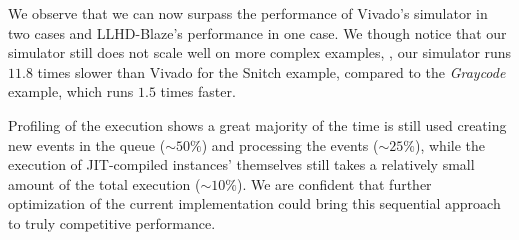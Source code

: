 We observe that we can now surpass the performance of Vivado's simulator in two cases and LLHD-Blaze's performance in one case. We though notice that our simulator still does not scale well on more complex examples, \eg, our simulator runs $11.8$ times slower than Vivado for the Snitch example, compared to the \textit{Graycode} example, which runs $1.5$ times faster.

Profiling of the execution shows a great majority of the time is still used creating new events in the queue ($\sim$$50\%$) and processing the events ($\sim$$25\%$), while the execution of JIT-compiled instances' themselves still takes a relatively small amount of the total execution ($\sim$$10\%$). We are confident that further optimization of the current implementation could bring this sequential approach to truly competitive performance.





